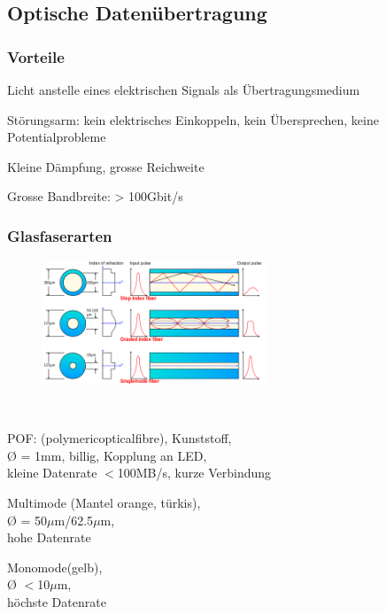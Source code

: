 \subsection{Optische Datenübertragung}
\subsubsection{Vorteile}
\begin{compactitem}
    \item Licht anstelle eines elektrischen Signals als Übertragungsmedium
    \item Störungsarm: kein elektrisches Einkoppeln, kein Übersprechen, keine Potentialprobleme
    \item Kleine Dämpfung, grosse Reichweite
    \item Grosse Bandbreite: > 100Gbit/s
\end{compactitem}

\subsubsection{Glasfaserarten}
\begin{figure}
    \vspace{-12pt}
    \centering
    \includegraphics[width=0.6\textwidth]{images/glasfaserarten}
\end{figure}
\ 
\vspace{-5pt}
\begin{compactitem}
    \item POF: (polymericopticalfibre), Kunststoff, \\
    Ø = 1mm, billig, Kopplung an LED, \\
    kleine Datenrate $<$100MB/s, kurze Verbindung
    \item Multimode (Mantel orange, türkis), \\
    Ø = 50$\mu$m/62.5$\mu$m, \\
    hohe Datenrate
    \item Monomode(gelb), \\
    Ø $<$10$\mu$m, \\
    höchste Datenrate
\end{compactitem}